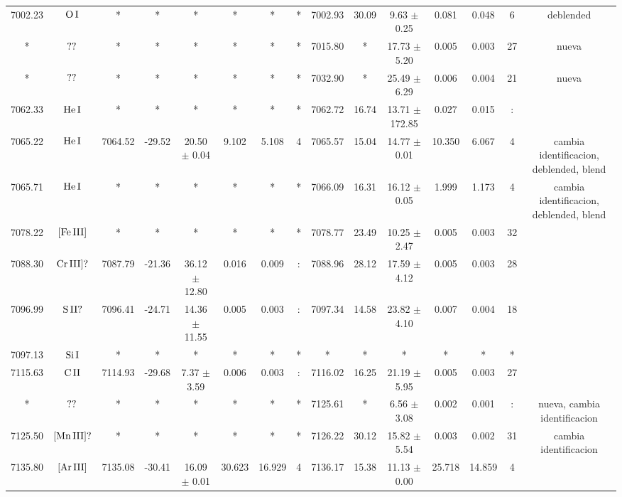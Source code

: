 \documentclass{article}
\begin{document}
\begin{table*}
\begin{adjustbox}{width=\textwidth}
\begin{tabular}{ccccccccccccccc}
7002.23 & $\mbox{O}\thinspace \mbox{I}$ & * & * & * & * & * & * & 7002.93 & 30.09 & 9.63 $\pm$ 0.25 & 0.081 & 0.048 & 6 &  deblended \\
* & $\mbox{??}\thinspace \mbox{}$ & * & * & * & * & * & * & 7015.80 & * & 17.73 $\pm$ 5.20 & 0.005 & 0.003 & 27 &  nueva \\
* & $\mbox{??}\thinspace \mbox{}$ & * & * & * & * & * & * & 7032.90 & * & 25.49 $\pm$ 6.29 & 0.006 & 0.004 & 21 &  nueva \\
7062.33 & $\mbox{He}\thinspace \mbox{I}$ & * & * & * & * & * & * & 7062.72 & 16.74 & 13.71 $\pm$ 172.85 & 0.027 & 0.015 & : &  \\
7065.22 & $\mbox{He}\thinspace \mbox{I}$ & 7064.52 & -29.52 & 20.50 $\pm$ 0.04 & 9.102 & 5.108 & 4 & 7065.57 & 15.04 & 14.77 $\pm$ 0.01 & 10.350 & 6.067 & 4 &  cambia identificacion, deblended, blend \\
7065.71 & $\mbox{He}\thinspace \mbox{I}$ & * & * & * & * & * & * & 7066.09 & 16.31 & 16.12 $\pm$ 0.05 & 1.999 & 1.173 & 4 &  cambia identificacion, deblended, blend \\
7078.22 & $\mbox{[Fe}\thinspace \mbox{III]}$ & * & * & * & * & * & * & 7078.77 & 23.49 & 10.25 $\pm$ 2.47 & 0.005 & 0.003 & 32 &  \\
7088.30 & $\mbox{Cr}\thinspace \mbox{III]?}$ & 7087.79 & -21.36 & 36.12 $\pm$ 12.80 & 0.016 & 0.009 & : & 7088.96 & 28.12 & 17.59 $\pm$ 4.12 & 0.005 & 0.003 & 28 &  \\
7096.99 & $\mbox{S}\thinspace \mbox{II?}$ & 7096.41 & -24.71 & 14.36 $\pm$ 11.55 & 0.005 & 0.003 & : & 7097.34 & 14.58 & 23.82 $\pm$ 4.10 & 0.007 & 0.004 & 18 &  \\
7097.13 & $\mbox{Si}\thinspace \mbox{I}$ & * & * & * & * & * & * & * & * & * & * & * & * &  \\
7115.63 & $\mbox{C}\thinspace \mbox{II}$ & 7114.93 & -29.68 & 7.37 $\pm$ 3.59 & 0.006 & 0.003 & : & 7116.02 & 16.25 & 21.19 $\pm$ 5.95 & 0.005 & 0.003 & 27 &  \\
* & $\mbox{??}\thinspace \mbox{}$ & * & * & * & * & * & * & 7125.61 & * & 6.56 $\pm$ 3.08 & 0.002 & 0.001 & : &  nueva, cambia identificacion \\
7125.50 & $\mbox{[Mn}\thinspace \mbox{III]?}$ & * & * & * & * & * & * & 7126.22 & 30.12 & 15.82 $\pm$ 5.54 & 0.003 & 0.002 & 31 &  cambia identificacion \\
7135.80 & $\mbox{[Ar}\thinspace \mbox{III]}$ & 7135.08 & -30.41 & 16.09 $\pm$ 0.01 & 30.623 & 16.929 & 4 & 7136.17 & 15.38 & 11.13 $\pm$ 0.00 & 25.718 & 14.859 & 4 &  \\

\end{tabular}
\end{adjustbox}
\end{table*}
\end{document}
